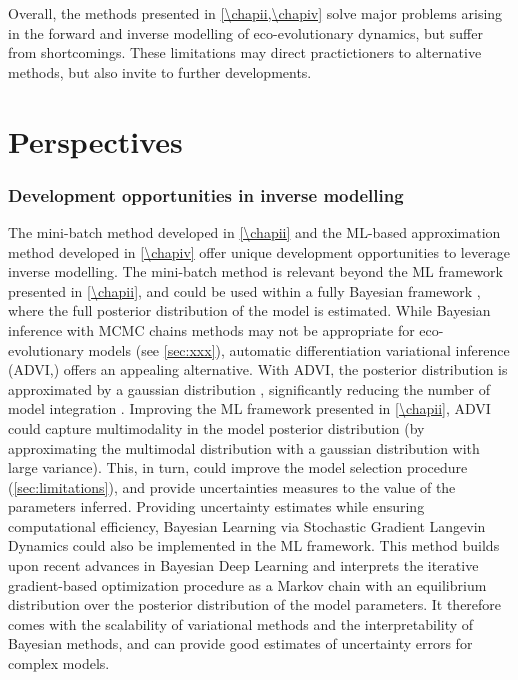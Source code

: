 Overall, the methods presented in \cref{\chapii,\chapiv} solve major problems arising in the forward and inverse modelling of eco-evolutionary dynamics, but suffer from shortcomings. These limitations may direct practictioners to alternative methods, but also invite to further developments.


\section{Perspectives}

\subsubsection{Development opportunities in inverse modelling}

The mini-batch method developed in \cref{\chapii} and the ML-based approximation method developed in \cref{\chapiv} offer unique development opportunities to leverage inverse modelling.
The mini-batch method is relevant beyond the ML framework presented in \cref{\chapii}, and could be used within a fully Bayesian framework \xxx, where the full posterior distribution of the model is estimated.
% 
While Bayesian inference with MCMC chains methods may not be appropriate for eco-evolutionary models (see \cref{sec:xxx}), automatic differentiation variational inference (ADVI,\xxx) offers an appealing alternative. With ADVI, the posterior distribution is approximated by a gaussian distribution \xxx, significantly reducing the number of model integration \citep{Gosh2021}. Improving the ML framework presented in \cref{\chapii}, ADVI could capture multimodality in the model posterior distribution (by approximating the multimodal distribution with a gaussian distribution with large variance). This, in turn, could improve the model selection procedure (\cref{sec:limitations}), and provide uncertainties measures to the value of the parameters inferred.
% 
Providing uncertainty estimates while ensuring computational efficiency, Bayesian Learning via Stochastic Gradient Langevin Dynamics \citep{Welling2011BayesianLV} could also be implemented in the ML framework. This method builds upon recent advances in Bayesian Deep Learning \citep{Wilson2020} and interprets the iterative gradient-based optimization procedure as a Markov chain with an equilibrium distribution over the posterior distribution of the model parameters. It therefore comes with the scalability of variational methods and the interpretability of Bayesian methods, and can provide good estimates of uncertainty errors for complex models.

